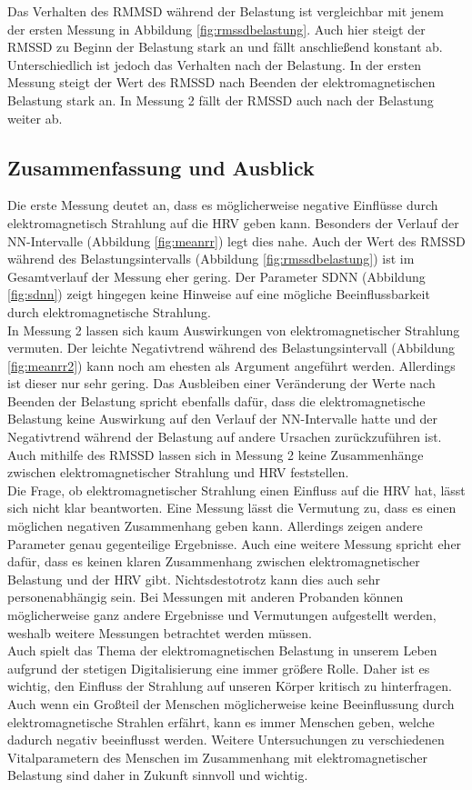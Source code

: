 Das Verhalten des RMMSD während der Belastung ist vergleichbar mit jenem der ersten Messung in Abbildung \ref{fig:rmssdbelastung}. Auch hier steigt der RMSSD zu Beginn der Belastung stark an und fällt anschließend konstant ab. Unterschiedlich ist jedoch das Verhalten nach der Belastung. In der ersten Messung steigt der Wert des RMSSD nach Beenden der elektromagnetischen Belastung stark an. In Messung 2 fällt der RMSSD auch nach der Belastung weiter ab.

\subsection{Zusammenfassung und Ausblick}
Die erste Messung deutet an, dass es möglicherweise negative Einflüsse durch elektromagnetisch Strahlung auf die HRV geben kann. Besonders der Verlauf der NN-Intervalle (Abbildung \ref{fig:meanrr}) legt dies nahe. Auch der Wert des RMSSD während des Belastungsintervalls (Abbildung \ref{fig:rmssdbelastung})  ist im Gesamtverlauf der Messung eher gering. Der Parameter SDNN (Abbildung \ref{fig:sdnn}) zeigt hingegen keine Hinweise auf eine mögliche Beeinflussbarkeit durch elektromagnetische Strahlung. \\
In Messung 2 lassen sich kaum Auswirkungen von elektromagnetischer Strahlung vermuten. Der leichte Negativtrend während des Belastungsintervall (Abbildung \ref{fig:meanrr2}) kann noch am ehesten als Argument angeführt werden. Allerdings ist dieser nur sehr gering. Das Ausbleiben einer Veränderung der Werte nach Beenden der Belastung spricht ebenfalls dafür, dass die elektromagnetische Belastung keine Auswirkung auf den Verlauf der NN-Intervalle hatte und der Negativtrend während der Belastung auf andere Ursachen zurückzuführen ist. Auch mithilfe des RMSSD lassen sich in Messung 2 keine Zusammenhänge zwischen elektromagnetischer Strahlung und HRV feststellen.\\

Die Frage, ob elektromagnetischer Strahlung einen Einfluss auf die HRV hat, lässt sich nicht klar beantworten. Eine Messung lässt die Vermutung zu, dass es einen möglichen negativen Zusammenhang geben kann. Allerdings zeigen andere Parameter genau gegenteilige Ergebnisse. Auch eine weitere Messung spricht eher dafür, dass es keinen klaren Zusammenhang zwischen elektromagnetischer Belastung und der HRV gibt. Nichtsdestotrotz kann dies auch sehr personenabhängig sein. Bei Messungen mit anderen Probanden können möglicherweise ganz andere Ergebnisse und Vermutungen aufgestellt werden, weshalb weitere Messungen betrachtet werden müssen. \\
Auch spielt das Thema der elektromagnetischen Belastung in unserem Leben aufgrund der stetigen Digitalisierung eine immer größere Rolle. Daher ist es wichtig, den Einfluss der Strahlung auf unseren Körper kritisch zu hinterfragen. Auch wenn ein Großteil der Menschen möglicherweise keine Beeinflussung durch elektromagnetische Strahlen erfährt, kann es immer Menschen geben, welche dadurch negativ beeinflusst werden. Weitere Untersuchungen zu verschiedenen Vitalparametern des Menschen im Zusammenhang mit elektromagnetischer Belastung sind daher in Zukunft sinnvoll und wichtig. \\


